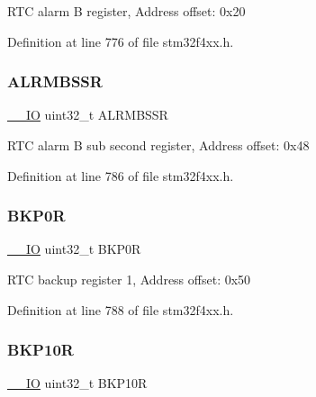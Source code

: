 R\+TC alarm B register, Address offset\+: 0x20 

Definition at line 776 of file stm32f4xx.\+h.

\mbox{\label{struct_r_t_c___type_def_a4ef7499da5d5beb1cfc81f7be057a7b2}} 
\subsubsection{\texorpdfstring{A\+L\+R\+M\+B\+S\+SR}{ALRMBSSR}}
{\footnotesize\ttfamily \hyperlink{group___c_m_s_i_s__core__definitions_gaec43007d9998a0a0e01faede4133d6be}{\+\_\+\+\_\+\+IO} uint32\+\_\+t A\+L\+R\+M\+B\+S\+SR}

R\+TC alarm B sub second register, Address offset\+: 0x48 

Definition at line 786 of file stm32f4xx.\+h.

\mbox{\label{struct_r_t_c___type_def_a4808ec597e5a5fefd8a83a9127dd1aec}} 
\subsubsection{\texorpdfstring{B\+K\+P0R}{BKP0R}}
{\footnotesize\ttfamily \hyperlink{group___c_m_s_i_s__core__definitions_gaec43007d9998a0a0e01faede4133d6be}{\+\_\+\+\_\+\+IO} uint32\+\_\+t B\+K\+P0R}

R\+TC backup register 1, Address offset\+: 0x50 

Definition at line 788 of file stm32f4xx.\+h.

\mbox{\label{struct_r_t_c___type_def_aade2881a3e408bfd106b27f78bbbcfc9}} 
\subsubsection{\texorpdfstring{B\+K\+P10R}{BKP10R}}
{\footnotesize\ttfamily \hyperlink{group___c_m_s_i_s__core__definitions_gaec43007d9998a0a0e01faede4133d6be}{\+\_\+\+\_\+\+IO} uint32\+\_\+t B\+K\+P10R}

